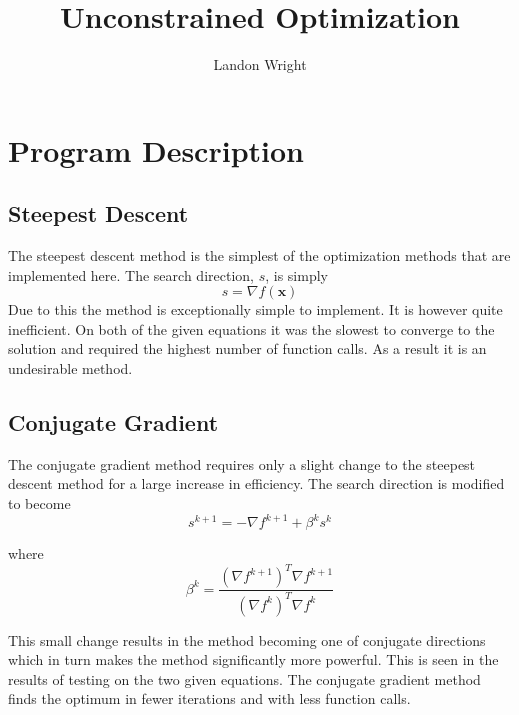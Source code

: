 \documentclass{article}
\begin{document}
\singlespacing
\title{Unconstrained Optimization}
\author{Landon Wright}
\maketitle
\section{Program Description}

\subsection{Steepest Descent}
The steepest descent method is the simplest of the optimization methods that are implemented here.  The search direction, $s$, is simply 
\begin{equation}
s = \nabla f(\textbf{x})
\end{equation}
Due to this the method is exceptionally simple to implement. It is however quite inefficient.  On both of the given equations it was the slowest to converge to the solution and required the highest number of function calls.  As a result it is an undesirable method.

\subsection{Conjugate Gradient}
The conjugate gradient method requires only a slight change to the steepest descent method for a large increase in efficiency.  The search direction is modified to become
\begin{equation}
s^{k+1} = - \nabla f^{k+1} + \beta^k s^k
\end{equation}

where
\begin{equation}
\beta^k = \frac{\left(\nabla f^{k+1}\right)^T \nabla f^{k+1}}{\left(\nabla f^{k}\right)^T \nabla f^{k}}
\end{equation}

This small change results in the method becoming one of conjugate directions which in turn makes the method significantly more powerful.  This is seen in the results of testing on the two given equations. The conjugate gradient method finds the optimum in fewer iterations and with less function calls.
\end{document}
